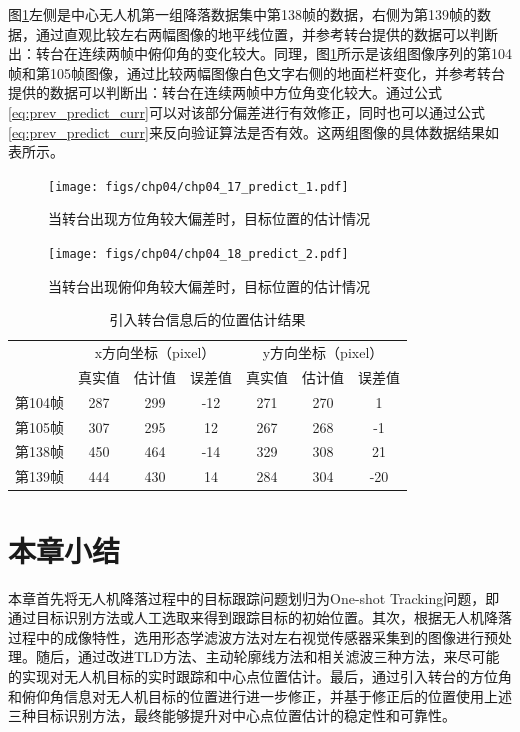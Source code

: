 图\ref{fig:chp04_17_predict_1}左侧是中心无人机第一组降落数据集中第138帧的数据，右侧为第139帧的数据，通过直观比较左右两幅图像的地平线位置，并参考转台提供的数据可以判断出：转台在连续两帧中俯仰角的变化较大。同理，图\ref{fig:chp04_17_predict_1}所示是该组图像序列的第104帧和第105帧图像，通过比较两幅图像白色文字右侧的地面栏杆变化，并参考转台提供的数据可以判断出：转台在连续两帧中方位角变化较大。通过公式\ref{eq:prev_predict_curr}可以对该部分偏差进行有效修正，同时也可以通过公式\ref{eq:prev_predict_curr}来反向验证算法是否有效。这两组图像的具体数据结果如表所示。

\begin{figure}[t]
	\centering
	\texttt{[image: figs/chp04/chp04\_17\_predict\_1.pdf]}
	\caption{当转台出现方位角较大偏差时，目标位置的估计情况}
	\label{fig:chp04_17_predict_1}
\end{figure}

\begin{figure}[ht]   
	\centering
	\texttt{[image: figs/chp04/chp04\_18\_predict\_2.pdf]}
	\caption{当转台出现俯仰角较大偏差时，目标位置的估计情况}
	\label{fig:chp04_18_predict_2}
\end{figure}

\begin{table}[]
	\centering
	\caption{引入转台信息后的位置估计结果}
	\label{my-label}
	\begin{tabular}{lccc|ccc}
		\hline
		& \multicolumn{3}{c|}{x方向坐标（pixel）}                         & \multicolumn{3}{c}{y方向坐标（pixel）}   \\ \cline{2-7} 
		& 真实值 & \multicolumn{1}{l}{估计值} & \multicolumn{1}{l|}{误差值} & 真实值 & 估计值 & \multicolumn{1}{l}{误差值} \\ \hline
		\multicolumn{1}{c}{第104帧} & 287 & 299                     & -12                      & 271 & 270 & 1                       \\
		\multicolumn{1}{c}{第105帧} & 307 & 295                     & 12                       & 267 & 268 & -1                      \\ \hline
		第138帧                     & 450 & 464                     & -14                      & 329 & 308 & 21                      \\
		第139帧                     & 444 & 430                     & 14                       & 284 & 304 & -20                     \\ \hline
	\end{tabular}
\end{table}

\section{本章小结}
本章首先将无人机降落过程中的目标跟踪问题划归为One-shot Tracking问题，即通过目标识别方法或人工选取来得到跟踪目标的初始位置。其次，根据无人机降落过程中的成像特性，选用形态学滤波方法对左右视觉传感器采集到的图像进行预处理。随后，通过改进TLD方法、主动轮廓线方法和相关滤波三种方法，来尽可能的实现对无人机目标的实时跟踪和中心点位置估计。最后，通过引入转台的方位角和俯仰角信息对无人机目标的位置进行进一步修正，并基于修正后的位置使用上述三种目标识别方法，最终能够提升对中心点位置估计的稳定性和可靠性。
